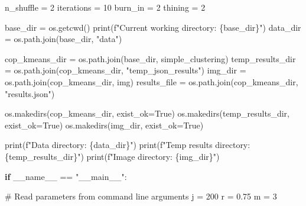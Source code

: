 \documentclass[
  letterpaper,
  DIV=11,
  numbers=noendperiod]{scrreprt}
\newenvironment{Shaded}{\begin{snugshade}}{\end{snugshade}}
\newcommand{\BuiltInTok}[1]{\textcolor[rgb]{0.00,0.23,0.31}{#1}}
\newcommand{\CommentTok}[1]{\textcolor[rgb]{0.37,0.37,0.37}{#1}}
\newcommand{\ControlFlowTok}[1]{\textcolor[rgb]{0.00,0.23,0.31}{\textbf{#1}}}
\newcommand{\DecValTok}[1]{\textcolor[rgb]{0.68,0.00,0.00}{#1}}
\newcommand{\FloatTok}[1]{\textcolor[rgb]{0.68,0.00,0.00}{#1}}
\newcommand{\NormalTok}[1]{\textcolor[rgb]{0.00,0.23,0.31}{#1}}
\newcommand{\OperatorTok}[1]{\textcolor[rgb]{0.37,0.37,0.37}{#1}}
\newcommand{\SpecialCharTok}[1]{\textcolor[rgb]{0.37,0.37,0.37}{#1}}
\newcommand{\SpecialStringTok}[1]{\textcolor[rgb]{0.13,0.47,0.30}{#1}}
\newcommand{\StringTok}[1]{\textcolor[rgb]{0.13,0.47,0.30}{#1}}
\newcommand{\VariableTok}[1]{\textcolor[rgb]{0.07,0.07,0.07}{#1}}
\begin{document}
\begin{Shaded}
\begin{Highlighting}[]
\NormalTok{n\_shuffle }\OperatorTok{=} \DecValTok{2}
\NormalTok{iterations }\OperatorTok{=} \DecValTok{10}
\NormalTok{burn\_in }\OperatorTok{=} \DecValTok{2}
\NormalTok{thining }\OperatorTok{=} \DecValTok{2}

\NormalTok{base\_dir }\OperatorTok{=}\NormalTok{ os.getcwd()}
\BuiltInTok{print}\NormalTok{(}\SpecialStringTok{f"Current working directory: }\SpecialCharTok{\{}\NormalTok{base\_dir}\SpecialCharTok{\}}\SpecialStringTok{"}\NormalTok{)}
\NormalTok{data\_dir }\OperatorTok{=}\NormalTok{ os.path.join(base\_dir, }\StringTok{"data"}\NormalTok{)}

\NormalTok{cop\_kmeans\_dir }\OperatorTok{=}\NormalTok{ os.path.join(base\_dir, }\StringTok{\textquotesingle{}simple\_clustering\textquotesingle{}}\NormalTok{)}
\NormalTok{temp\_results\_dir }\OperatorTok{=}\NormalTok{ os.path.join(cop\_kmeans\_dir, }\StringTok{"temp\_json\_results"}\NormalTok{)}
\NormalTok{img\_dir }\OperatorTok{=}\NormalTok{ os.path.join(cop\_kmeans\_dir, }\StringTok{\textquotesingle{}img\textquotesingle{}}\NormalTok{)}
\NormalTok{results\_file }\OperatorTok{=}\NormalTok{ os.path.join(cop\_kmeans\_dir, }\StringTok{"results.json"}\NormalTok{)}

\NormalTok{os.makedirs(cop\_kmeans\_dir, exist\_ok}\OperatorTok{=}\VariableTok{True}\NormalTok{)}
\NormalTok{os.makedirs(temp\_results\_dir, exist\_ok}\OperatorTok{=}\VariableTok{True}\NormalTok{)}
\NormalTok{os.makedirs(img\_dir, exist\_ok}\OperatorTok{=}\VariableTok{True}\NormalTok{)}

\BuiltInTok{print}\NormalTok{(}\SpecialStringTok{f"Data directory: }\SpecialCharTok{\{}\NormalTok{data\_dir}\SpecialCharTok{\}}\SpecialStringTok{"}\NormalTok{)}
\BuiltInTok{print}\NormalTok{(}\SpecialStringTok{f"Temp results directory: }\SpecialCharTok{\{}\NormalTok{temp\_results\_dir}\SpecialCharTok{\}}\SpecialStringTok{"}\NormalTok{)}
\BuiltInTok{print}\NormalTok{(}\SpecialStringTok{f"Image directory: }\SpecialCharTok{\{}\NormalTok{img\_dir}\SpecialCharTok{\}}\SpecialStringTok{"}\NormalTok{)}

\ControlFlowTok{if} \VariableTok{\_\_name\_\_} \OperatorTok{==} \StringTok{"\_\_main\_\_"}\NormalTok{:}

    \CommentTok{\# Read parameters from command line arguments}
\NormalTok{    j }\OperatorTok{=} \DecValTok{200}
\NormalTok{    r }\OperatorTok{=} \FloatTok{0.75}
\NormalTok{    m }\OperatorTok{=} \DecValTok{3}


\end{Highlighting}
\end{Shaded}
\end{document}
